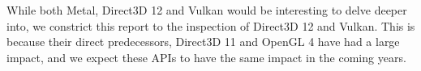 While both Metal, Direct3D 12 and Vulkan would be interesting to delve deeper into, we constrict this report to the inspection of Direct3D 12 and Vulkan.
This is because their direct predecessors, Direct3D 11 and OpenGL 4 have had a large impact, and we expect these \glspl{API} to have the same impact in the coming years.







